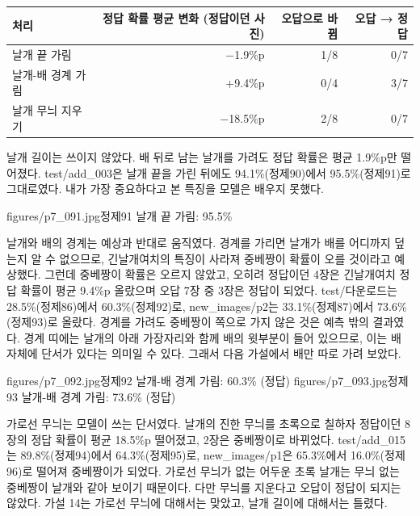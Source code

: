 \documentclass[11pt]{article}
\begin{document}
\begin{center}\footnotesize
\begin{tabular}{lrrr}
\toprule
처리 & 정답 확률 평균 변화 (정답이던 사진) & 오답으로 바뀜 & 오답 → 정답 \\
\midrule
날개 끝 가림 & $-$1.9\%p & 1/8 & 0/7 \\
날개-배 경계 가림 & +9.4\%p & 0/4 & 3/7 \\
날개 무늬 지우기 & $-$18.5\%p & 2/8 & 0/7 \\
\bottomrule
\end{tabular}
\end{center}

날개 길이는 쓰이지 않았다. 배 뒤로 남는 날개를 가려도 정답 확률은 평균 1.9\%p만 떨어졌다. test/add\_003은 날개 끝을 가린 뒤에도 94.1\%(정제90)에서 95.5\%(정제91)로 그대로였다. 내가 가장 중요하다고 본 특징을 모델은 배우지 못했다.

           {figures/p7_091.jpg}{정제91 날개 끝 가림: 95.5\%}

날개와 배의 경계는 예상과 반대로 움직였다. 경계를 가리면 날개가 배를 어디까지 덮는지 알 수 없으므로, 긴날개여치의 특징이 사라져 중베짱이 확률이 오를 것이라고 예상했다. 그런데 중베짱이 확률은 오르지 않았고, 오히려 정답이던 4장은 긴날개여치 정답 확률이 평균 9.4\%p 올랐으며 오답 7장 중 3장은 정답이 되었다. test/다운로드는 28.5\%(정제86)에서 60.3\%(정제92)로, new\_images/p2는 33.1\%(정제87)에서 73.6\%(정제93)로 올랐다. 경계를 가려도 중베짱이 쪽으로 가지 않은 것은 예측 밖의 결과였다. 경계 띠에는 날개의 아래 가장자리와 함께 배의 윗부분이 들어 있으므로, 이는 배 자체에 단서가 있다는 의미일 수 있다. 그래서 다음 가설에서 배만 따로 가려 보았다.

           {figures/p7_092.jpg}{정제92 날개-배 경계 가림: 60.3\% (정답)}
           {figures/p7_093.jpg}{정제93 날개-배 경계 가림: 73.6\% (정답)}

가로선 무늬는 모델이 쓰는 단서였다. 날개의 진한 무늬를 초록으로 칠하자 정답이던 8장의 정답 확률이 평균 18.5\%p 떨어졌고, 2장은 중베짱이로 바뀌었다. test/add\_015는 89.8\%(정제94)에서 64.3\%(정제95)로, new\_images/p1은 65.3\%에서 16.0\%(정제96)로 떨어져 중베짱이가 되었다. 가로선 무늬가 없는 어두운 초록 날개는 무늬 없는 중베짱이 날개와 같아 보이기 때문이다. 다만 무늬를 지운다고 오답이 정답이 되지는 않았다. 가설 14는 가로선 무늬에 대해서는 맞았고, 날개 길이에 대해서는 틀렸다.
\end{document}

